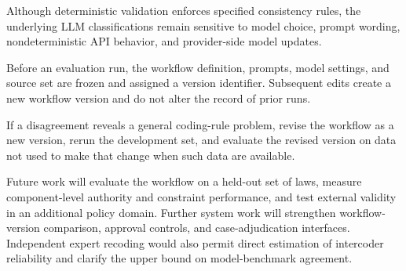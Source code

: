 Although deterministic validation enforces specified consistency rules,
the underlying LLM classifications remain sensitive to model choice,
prompt wording, nondeterministic API behavior, and provider-side model
updates.




%
%

Before an evaluation run, the workflow definition, prompts, model
settings, and source set are frozen and assigned a version identifier.
Subsequent edits create a new workflow version and do not alter the
record of prior runs.


If a disagreement reveals a general coding-rule problem, revise the
workflow as a new version, rerun the development set, and evaluate the
revised version on data not used to make that change when such data are
available.


%
%

Future work will evaluate the workflow on a held-out set of laws,
measure component-level authority and constraint performance, and test
external validity in an additional policy domain. Further system work
will strengthen workflow-version comparison, approval controls, and
case-adjudication interfaces. Independent expert recoding would also
permit direct estimation of intercoder reliability and clarify the
upper bound on model-benchmark agreement.


